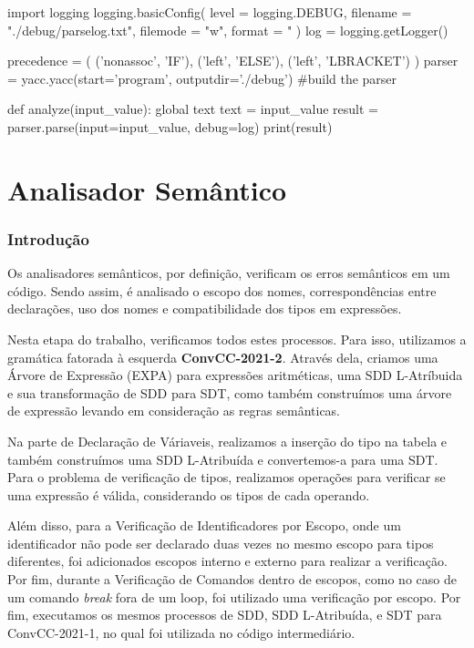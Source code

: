 \documentclass[
	12pt,				%
	openright,			%
	twoside,			%
	a4paper,			%
	english,			%
	french,				%
	spanish,			%
	brazil				%
	]{abntex2}
\begin{document}
\begin{python}
import logging
logging.basicConfig(
    level = logging.DEBUG,
    filename = "./debug/parselog.txt",
    filemode = "w",
    format = "%
)
log = logging.getLogger()

precedence = (
    ('nonassoc', 'IF'), 
    ('left', 'ELSE'),
    ('left', 'LBRACKET')
)
parser = yacc.yacc(start='program', outputdir='./debug')  #build the parser

def analyze(input_value):
    global text
    text = input_value
    result = parser.parse(input=input_value, debug=log)
    print(result)
\end{python}


\part{Analisador Semântico}

\section{Introdução}
Os analisadores semânticos, por definição, verificam os erros semânticos em um código.
Sendo assim, é analisado o escopo dos nomes, correspondências entre declarações, uso dos nomes e
compatibilidade dos tipos em expressões.

Nesta etapa do trabalho, verificamos todos estes processos.
Para isso, utilizamos a gramática fatorada à esquerda \textbf{ConvCC-2021-2}.
Através dela, criamos uma Árvore de Expressão (EXPA) para expressões aritméticas, uma SDD L-Atríbuida e 
sua transformação de SDD para SDT, como também construímos uma árvore de expressão levando em consideração
as regras semânticas.

Na parte de Declaração de Váriaveis, realizamos a inserção do tipo na tabela
e também construímos uma SDD L-Atribuída e convertemos-a para uma SDT.
Para o problema de verificação de tipos, realizamos operações para
verificar se uma expressão é válida, considerando os tipos de cada operando.

Além disso, para a Verificação de Identificadores por Escopo, onde um identificador
não pode ser declarado duas vezes no mesmo escopo para tipos diferentes, foi
adicionados escopos interno e externo para realizar a verificação. Por fim, durante
a Verificação de Comandos dentro de escopos, como no caso de um comando \emph{break}
fora de um loop, foi utilizado uma verificação por escopo. Por fim,
executamos os mesmos processos de SDD, SDD L-Atribuída, e SDT para ConvCC-2021-1,
no qual foi utilizada no código intermediário.
\end{document}
